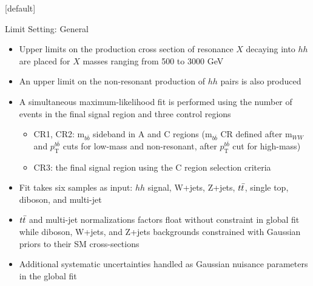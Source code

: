\documentclass{beamer}
\newcommand*{\ttbar}{\ensuremath{\lowercase{t\bar{t}}}\xspace}
\newcommand*{\mww}{\ensuremath{\text{m}_{WW}}\xspace}
\newcommand*{\ptbb}{\ensuremath{p_{\text{T}}^{b\bar{b}}}\xspace}
\newcommand*{\mbb}{\ensuremath{\text{m}_{b\bar{b}}}\xspace}
\begin{document}
{  \makeatletter %
  [default]
  \def\beamer@entrycode{\vspace*{-1.075\headheight}}
  \begin{frame}{Limit Setting: General}
    \begin{itemize}\small
    \item Upper limits on the production cross section of resonance $X$ decaying into $hh$ are placed for $X$ masses ranging from 500 to 3000 GeV
    \item An upper limit on the non-resonant production of $hh$ pairs is also produced
    \item A simultaneous maximum-likelihood fit is performed using the number of events in the final signal region and three control regions
      \begin{itemize}\footnotesize
        \item CR1, CR2: \mbb sideband in A and C regions (\mbb CR defined after \mww and \ptbb cuts for low-mass and non-resonant, after \ptbb cut for high-mass)
        \item CR3: the final signal region using the C region selection criteria
      \end{itemize}
    \item Fit takes six samples as input: $hh$ signal, W+jets, Z+jets, \ttbar, single top, diboson, and multi-jet
    \item \ttbar and multi-jet normalizations factors float without constraint in global fit while diboson, W+jets, and Z+jets backgrounds constrained with Gaussian priors to their SM cross-sections
    \item Additional systematic uncertainties handled as Gaussian nuisance parameters in the global fit
    \end{itemize}

  \end{frame}

}
\end{document}
